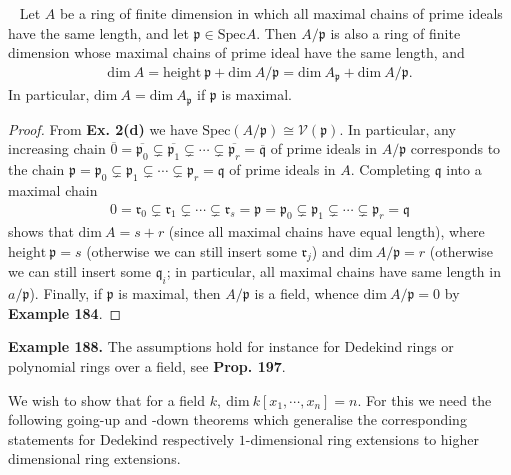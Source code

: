 \documentclass[12pt,a4paper,footinclude=true,headinclude=true]{scrbook} %
\newenvironment{proposition}[2][]
{\renewcommand\theinnercustomprop{#2}\innercustomprop[#1] 
\begin{mdframed}[backgroundcolor=gray!20]\ }
{\end{mdframed}\endinnercustomprop}
\newenvironment{example}[2][Example]
    { \begin{mdframed}[backgroundcolor=gray!20] \textbf{#1 #2.} }
    {  \end{mdframed}}
\begin{document}
\begin{proposition}{187}
    Let $A$ be a ring of finite dimension in which all maximal chains of prime ideals have the same length, and let $\mathfrak{p}\in\mathrm{Spec}A$. Then $A/\mathfrak{p}$ is also a ring of finite dimension whose maximal chains of prime ideal have the same length, and 
    \begin{align*}
        \mathrm{dim}\ A=\mathrm{height}\ \mathfrak{p}+\mathrm{dim}\ A/\mathfrak{p}=\mathrm{dim}\ A_\mathfrak{p}+\mathrm{dim}\ A/\mathfrak{p}.
    \end{align*}
    In particular, $\mathrm{dim}\ A=\mathrm{dim}\ A_\mathfrak{p}$ if $\mathfrak{p}$ is maximal.
\end{proposition}
\begin{proof}
    From \textbf{Ex. 2(d)} we have $\mathrm{Spec}(A/\mathfrak{p})\cong\mathcal{V}(\mathfrak{p})$. In particular, any increasing chain $\overline{0}=\overline{\mathfrak{p}_0}\subsetneq\overline{\mathfrak{p}_1}\subsetneq\cdots\subsetneq\overline{\mathfrak{p}_r}=\overline{\mathfrak{q}}$ of prime ideals in $A/\mathfrak{p}$ corresponds to the chain $\mathfrak{p}=\mathfrak{p}_0\subsetneq\mathfrak{p}_1\subsetneq\cdots\subsetneq\mathfrak{p}_r=\mathfrak{q}$ of prime ideals in $A$. Completing $\mathfrak{q}$ into a maximal chain
    \begin{align*}
        0=\mathfrak{r}_0\subsetneq\mathfrak{r}_1\subsetneq\cdots\subsetneq\mathfrak{r}_s=\mathfrak{p}=\mathfrak{p}_0\subsetneq\mathfrak{p}_1\subsetneq\cdots\subsetneq\mathfrak{p}_r=\mathfrak{q}
    \end{align*}
    shows that $\mathrm{dim}\ A=s+r$ (since all maximal chains have equal length), where $\mathrm{height}\ \mathfrak{p}=s$ (otherwise we can still insert some $\mathfrak{r}_j$) and $\mathrm{dim}\ A/\mathfrak{p}=r$ (otherwise we can still insert some $\mathfrak{q}_i$; in particular, all maximal chains have same length in $a/\mathfrak{p}$). Finally, if $\mathfrak{p}$ is maximal, then $A/\mathfrak{p}$ is a field, whence $\mathrm{dim}\ A/\mathfrak{p}=0$ by \textbf{Example 184}.
\end{proof}

\begin{example}{188}
    The assumptions hold for instance for Dedekind rings or polynomial rings over a field, see \textbf{Prop. 197}.
\end{example}

We wish to show that for a field $k,\ \mathrm{dim}\ k[x_1,\cdots,x_n]=n$. For this we need the following going-up and -down theorems which generalise the corresponding statements for Dedekind respectively $1$-dimensional ring extensions to higher dimensional ring extensions.
\end{document}
